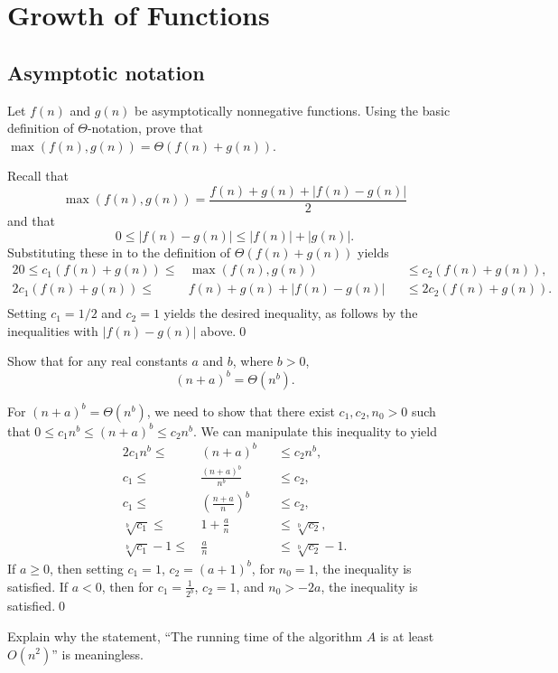 \chapter{Growth of Functions}
\section{Asymptotic notation}

 Let $f(n)$ and $g(n)$ be asymptotically nonnegative functions. Using the basic definition of $\Theta$-notation, prove that $\max(f(n), g(n)) = \Theta(f(n) + g(n))$.

\sol Recall that $$\max(f(n), g(n)) = \frac{f(n) + g(n) + |f(n) - g(n)|}{2}$$ and that $$0 \leq |f(n) - g(n)| \leq |f(n)| + |g(n)|.$$ Substituting these in to the definition of $\Theta(f(n) + g(n))$ yields
\begin{alignat*}{2}
    0 \leq c_1 (f(n) + g(n)) \leq & \max(f(n), g(n)) &&\leq c_2(f(n) + g(n)), \\
    2c_1(f(n) + g(n)) \leq & f(n) + g(n) + |f(n) - g(n)| &&\leq 2c_2 (f(n) + g(n)). \\
\end{alignat*}
Setting $c_1 = 1/2$ and $c_2 = 1$ yields the desired inequality, as follows by the inequalities with $|f(n) - g(n)|$ above.\qed


Show that for any real constants $a$ and $b$, where $b > 0$, $$(n+a)^b = \Theta(n^b).$$

\sol For $(n+a)^b = \Theta(n^b)$, we need to show that there exist $c_1, c_2, n_0 > 0$ such that $0 \leq c_1 n^b \leq (n + a)^b \leq c_2n^b$. We can manipulate this inequality to yield
\begin{alignat*}{2}
    c_1 n^b \leq \, &(n + a)^b &&\leq c_2 n^b, \\
    c_1 \leq \, &\frac{(n+a)^b}{n^b} &&\leq c_2, \\
    c_1 \leq \, &\left(\frac{n+a}{n}\right)^b &&\leq c_2, \\
    \sqrt[b]{c_1} \leq \, &1 + \frac{a}{n} &&\leq \sqrt[b]{c_2}, \\
    \sqrt[b]{c_1} - 1 \leq \, &\frac{a}{n} &&\leq \sqrt[b]{c_2} - 1.
\end{alignat*}
If $a \geq 0$, then setting $c_1 = 1$, $c_2 = (a + 1)^b$, for $n_0 = 1$, the inequality is satisfied. If $a < 0$, then for $c_1 = \frac{1}{2^b}$, $c_2 = 1$, and $n_0 > -2a$, the inequality is satisfied.\qed


 Explain why the statement, ``The running time of the algorithm $A$ is at least $O(n^2)$'' is meaningless.

